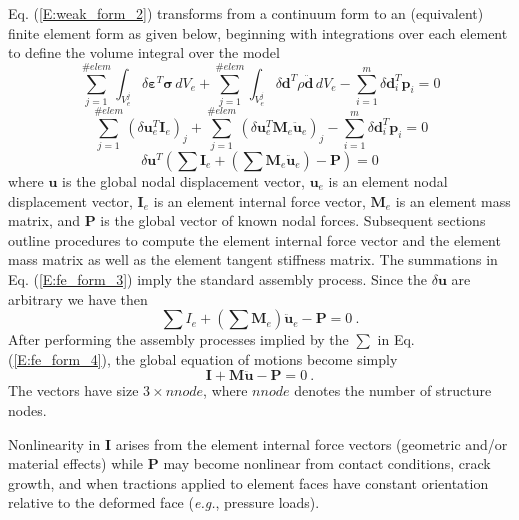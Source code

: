 \documentclass[11pt]{report}
\numberwithin{equation}{section}
\newcommand{\eg}{\emph{e.g.},\xspace}
\begin{document}
Eq. (\ref{E:weak_form_2}) transforms from a continuum form to an 
(equivalent) finite element form as given below, beginning 
with integrations over each element to define the volume 
integral over the model
%
\begin{equation}\label{E:fe_form_1}
\sum_{j=1}^{\#elem}   \int_{V_e^j}\delta \bm{\varepsilon}^T \bm{\sigma}\, dV_e +
\sum_{j=1}^{\#elem} \int_{V_e^j}\delta \bm{d}^T  
\rho \ddot{\bm{d}} \, dV_e - \sum_{i=1}^m \delta \bm{d}_i^T \bm{p}_i = 0
\end{equation}
%
%
\begin{equation}\label{E:fe_form_2}
\sum_{j=1}^{\#elem}  \left ( \delta \bm{u}_e^T\bm{I}_e\right)_j +
\sum_{j=1}^{\#elem} \left ( \delta \bm{u}_e^T\mathbf{M}_e\ddot{\bm{u}}_e\right)_j   
 - \sum_{i=1}^m \delta \bm{d}_i^T \bm{p}_i = 0
\end{equation}
%
%
\begin{equation}\label{E:fe_form_3}
\delta \bm{u}^T    \left(       \sum \bm{I}_e +
\left ( \sum \mathbf{M}_e \ddot{\bm{u}}_e  \right )  
 - \bm{P} \right ) = 0
\end{equation}
%
\noindent 
where $\bm{u}$ is the global nodal displacement vector, $\bm{u}_e$ 
is an element nodal displacement vector, $\bm{I}_e$ is an element internal force vector, 
$\mathbf{M}_e$ is an element mass matrix,  and $\bm{P}$ is the global vector of known nodal forces. 
Subsequent sections outline procedures to compute the element internal force vector and 
the element mass matrix as well as the element tangent stiffness matrix. 
The summations in Eq. (\ref{E:fe_form_3}) imply the standard 
assembly process. Since the $\delta \bm{u}$ are arbitrary we have then
%
\begin{equation}\label{E:fe_form_4}
      \sum I_e +
\left ( \sum \mathbf{M}_e \right ) \ddot{\bm{u}}_e   
 - \bm{P}  = 0\ .
\end{equation}
%
After performing the assembly processes implied by the $\sum$ in Eq. (\ref{E:fe_form_4}), 
the global equation of motions become simply
%
\begin{equation}\label{E:fe_form_5}
 \bm{I} + \bm{M}  \ddot{\bm{u}} - \bm{P}  = 0\  .
\end{equation}
%
The vectors have size $3 \times nnode$, where $nnode$ denotes the number of 
structure nodes. 

Nonlinearity in $\bm{I}$ arises from the element internal force vectors 
(geometric and/or material effects) while $\bm{P}$ may become nonlinear  from contact conditions,
crack growth, and
when tractions applied to element faces have constant orientation relative 
to the deformed face (\eg pressure loads).
\end{document}
